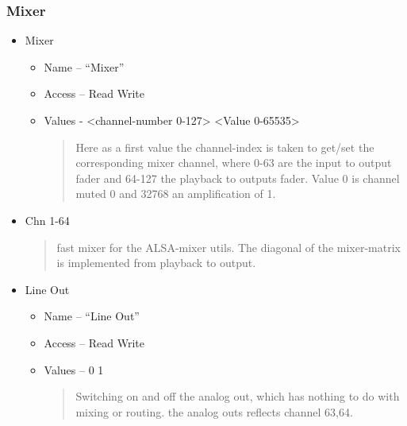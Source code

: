 \documentclass[a4paper,8pt,english]{sphinxmanual}
\begin{document}
\subsubsection{Mixer}
\label{sound/cards/hdspm:mixer}\begin{itemize}
\item {} 
Mixer
\begin{itemize}
\item {} 
Name -- ``Mixer''

\item {} 
Access -- Read Write

\item {} 
Values - \textless{}channel-number 0-127\textgreater{} \textless{}Value 0-65535\textgreater{}
\begin{quote}

Here as a first value the channel-index is taken to get/set the
corresponding mixer channel, where 0-63 are the input to output
fader and 64-127 the playback to outputs fader. Value 0
is channel muted 0 and 32768 an amplification of  1.
\end{quote}

\end{itemize}

\item {} 
Chn 1-64
\begin{quote}

fast mixer for the ALSA-mixer utils. The diagonal of the
mixer-matrix is implemented from playback to output.
\end{quote}

\item {} 
Line Out
\begin{itemize}
\item {} 
Name  -- ``Line Out''

\item {} 
Access -- Read Write

\item {} 
Values -- 0 1
\begin{quote}

Switching on and off the analog out, which has nothing to do
with mixing or routing. the analog outs reflects channel 63,64.
\end{quote}

\end{itemize}

\end{itemize}
\end{document}

